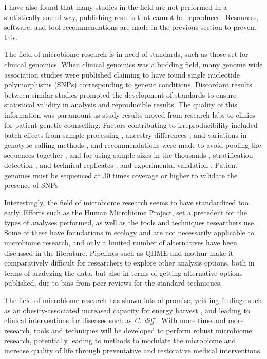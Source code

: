I have also found that many studies in the field are not performed in a statistically sound way, publishing results that cannot be reproduced. Resources, software, and tool recommendations are made in the previous section to prevent this.

The field of microbiome research is in need of standards, such as those set for clinical genomics. When clinical genomics was a budding field, many genome wide association studies were published claiming to have found single nucleotide polymorphisms (SNPs) corresponding to genetic conditions. Discordant results between similar studies prompted the development of standards to ensure statistical validity in analysis and reproducible results. The quality of this information was paramount as study results moved from research labs to clinics for patient genetic counselling. Factors contributing to irreproducibility included batch effects from sample processing \cite{leek2010tackling}, ancestry differences \cite{price2006principal}, and variations in genotype calling methods \cite{miclaus2010variability}, and recommendations were made to avoid pooling the sequences together \cite{mccarthy2008genome}, and for using sample sizes in the thousands \cite{burton2007genome}, stratification detection \cite{price2006principal}, and technical replicates \cite{hong2012technical}, and experimental validation \cite{mccarthy2008genome}. Patient genomes must be sequenced at 30 times coverage or higher to validate the presence of SNPs \cite{rehm2013acmg}

Interestingly, the field of microbiome research seems to have standardized too early. Efforts such as the Human Microbiome Project, set a precedent for the types of analyses performed, as well as the tools and techniques researchers use. Some of these have foundations in ecology and are not necessarily applicable to microbiome research, and only a limited number of alternatives have been discussed in the literature. Pipelines such as QIIME \cite{caporaso2010qiime} and mothur \cite{schloss2009introducing} make it comparatively difficult for researchers to explore other analysis options, both in terms of analyzing the data, but also in terms of getting alternative options published, due to bias from peer reviews for the standard techniques.

The field of microbiome research has shown lots of promise, yeilding findings such as an obesity-associated increased capacity for energy harvest \cite{turnbaugh2006obesity}, and leading to clinical interventions for diseases such as \textit{C. diff} \cite{petrof2013stool}. With more time and more research, tools and techniques will be developed to perform robust microbiome research, potentially leading to methods to modulate the microbiome and increase quality of life through preventative and restorative medical interventions.
